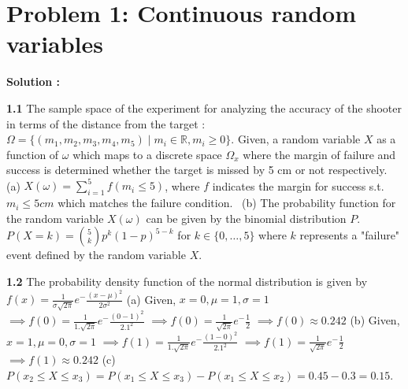 \documentclass[11pt, letterpaper]{article}
\newenvironment{problem}[2][Problem]
    {\section*{#1 #2}}
    {}
\begin{document}

\begin{problem}{1: Continuous random variables}
\end{problem}

\textbf{Solution :}

\textbf{1.1} The sample space of the experiment for analyzing the accuracy of the shooter in terms of the distance from the target : \newline 
$\Omega = \{(m_1,m_2,m_3,m_4,m_5) \mid m_i \in \mathbb{R}, m_i \ge 0\}$. \newline 
Given, a random variable $X$ as a function of $\omega$ which maps to a discrete space $\Omega_x$ where the margin of failure and success is determined whether the target is missed by 5 cm or not respectively. \newline \newline
(a) $X(\omega) = \sum_{i=1}^{5} f(m_i \le 5)$, where $f$ indicates the margin for success s.t. $m_i \le 5cm$ which matches the failure condition. \newline\
(b) The probability function for the random variable $X(\omega)$ can be given by the binomial distribution $P$. $P(X=k) = \binom{5}{k}p^k(1-p)^{5-k}$ for $k \in \{0, \dots, 5\}$ where $k$ represents a "failure" event defined by the random variable $X$. \newline

\textbf{1.2} The probability density function of the normal distribution is given by 
$f(x) = \frac{1}{\sigma\sqrt{2\pi}} e^-{\frac{(x-\mu)^2}{2\sigma^2}}$\newline\newline
(a) Given, $x = 0, \mu = 1, \sigma = 1$\newline
$\implies f(0) = \frac{1}{1.\sqrt{2\pi}}e^-{\frac{(0-1)^2}{2.1^2}}$ \newline
$\implies f(0) = \frac{1}{\sqrt{2\pi}}e^-\frac{1}{2}$ \newline
$\implies f(0) \approx 0.242$ \newline
(b) Given, $x = 1, \mu = 0, \sigma = 1$\newline
$\implies f(1) = \frac{1}{1.\sqrt{2\pi}}e^-{\frac{(1-0)^2}{2.1^2}}$ \newline
$\implies f(1) = \frac{1}{\sqrt{2\pi}}e^-\frac{1}{2}$ \newline
$\implies f(1) \approx 0.242$ \newline
(c) $P(x_2 \le X \le x_3) = P(x_1 \le X \le x_3) - P(x_1 \le X \le x_2) = 0.45 - 0.3 = 0.15$. \newline
\end{document}
